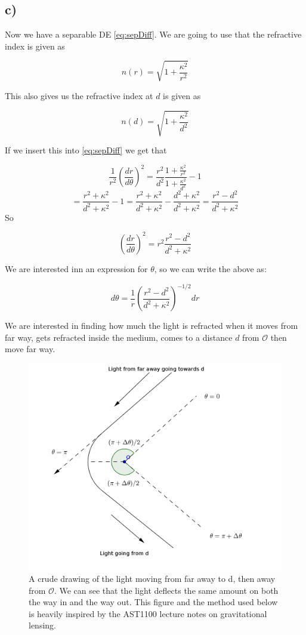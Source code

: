 \documentclass[a4paper,norsk, 10pt]{article}
\begin{document}
\subsection*{c)}

Now we have a separable DE \eqref{eq:sepDiff}. We are going to use that the refractive index is given as 

\begin{equation}
n(r) = \sqrt{1 + \frac{\kappa^2}{r^2}}
\label{eq:refIndex}
\end{equation}

This also gives us the refractive index at $d$ is given as

$$
n(d) = \sqrt{1 + \frac{\kappa^2}{d^2}}
$$

If we insert this into \eqref{eq:sepDiff} we get that 

$$
\frac{1}{r^2}\left(\frac{dr}{d\theta}\right)^2 = \frac{r^2}{d^2}\frac{1 + \frac{\kappa^2}{r^2}}{1 + \frac{\kappa^2}{d^2}} -1
$$
$$
= \frac{r^2 + \kappa^2}{d^2+\kappa^2} - 1 = \frac{r^2 + \kappa^2}{d^2+\kappa^2} - \frac{d^2+\kappa^2}{d^2+\kappa^2} = \frac{r^2 -d^2}{d^2 +\kappa^2}
$$
So

$$
\left(\frac{dr}{d\theta}\right)^2 = r^2\frac{r^2 -d^2}{d^2 +\kappa^2}
$$


We are interested inn an expression for $\theta$, so we can write the above as:

\begin{equation}
d\theta = \frac{1}{r}\left(\frac{r^2 -d^2}{d^2 +\kappa^2}\right)^{-1/2}dr
\end{equation}


We are interested in finding how much the light is refracted when it moves from far way, gets refracted inside the medium, comes to a distance $d$ from $\mathcal{O}$ then move far way.

\begin{figure}[H]
\centering
\includegraphics[scale=0.4]{3c.png}
\caption{A crude drawing of the light moving from far away to d, then away from $\mathcal{O}$. We can see that the light deflects the same amount on both the way in and the way out. This figure and the method used below is heavily inspired by the AST1100 lecture notes on gravitational lensing.}
\end{figure}
\end{document}
